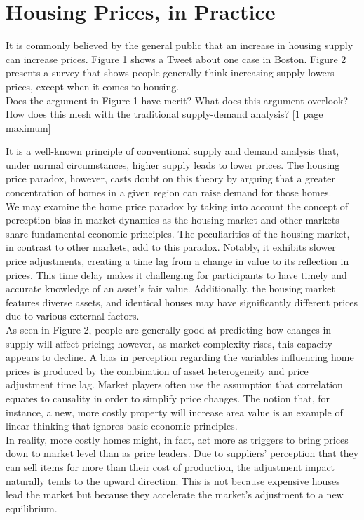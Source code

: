 \section{Housing Prices, in Practice}

\begin{tcolorbox}
    It is commonly believed by the general public that an increase in housing supply can increase prices.
    Figure 1 shows a Tweet about one case in Boston. Figure 2 presents a survey that shows people
    generally think increasing supply lowers prices, except when it comes to housing.\\

    Does the argument in Figure 1 have merit? What does this argument overlook? How does this
    mesh with the traditional supply-demand analysis? [1 page maximum]
\end{tcolorbox}

It is a well-known principle of conventional supply and demand analysis that, under normal circumstances, higher supply leads to lower prices. The housing price paradox, however, casts doubt on this theory by arguing that a greater concentration of homes in a given region can raise demand for those homes.\\

We may examine the home price paradox by taking into account the concept of perception bias in market dynamics as the housing market and other markets share fundamental economic principles. The peculiarities of the housing market, in contrast to other markets, add to this paradox. Notably, it exhibits slower price adjustments, creating a time lag from a change in value to its reflection in prices. This time delay makes it challenging for participants to have timely and accurate knowledge of an asset's fair value. Additionally, the housing market features diverse assets, and identical houses may have significantly different prices due to various external factors.\\

As seen in Figure 2, people are generally good at predicting how changes in supply will affect pricing; however, as market complexity rises, this capacity appears to decline. A bias in perception regarding the variables influencing home prices is produced by the combination of asset heterogeneity and price adjustment time lag. Market players often use the assumption that correlation equates to causality in order to simplify price changes. The notion that, for instance, a new, more costly property will increase area value is an example of linear thinking that ignores basic economic principles.\\

In reality, more costly homes might, in fact, act more as triggers to bring prices down to market level than as price leaders. Due to suppliers' perception that they can sell items for more than their cost of production, the adjustment impact naturally tends to the upward direction. This is not because expensive houses lead the market but because they accelerate the market's adjustment to a new equilibrium.\\
